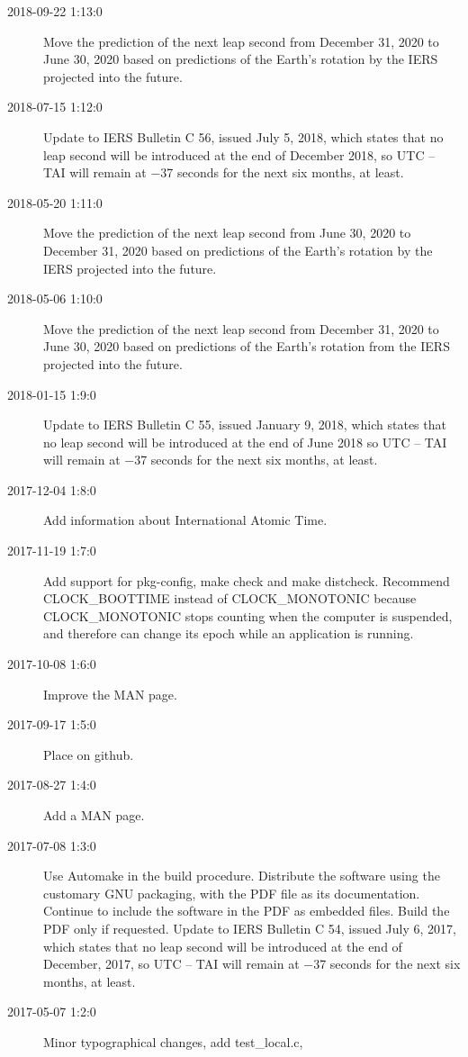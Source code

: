 \documentclass[letterpaper,twoside]{article}
\begin{document}
\begin{description}
\item[2018-09-22 1:13:0] Move the prediction of the next leap second
  from December 31, 2020 to June 30, 2020 based on predictions of
  the Earth's rotation by the IERS projected into the future.
\item[2018-07-15 1:12:0] Update to IERS Bulletin C 56, issued July
  5, 2018, which states that no leap second will be introduced
  at the end of December 2018, so UTC -- TAI will remain at
  \num{-37} seconds for the next six months, at least.
\item[2018-05-20 1:11:0] Move the prediction of the next leap second
  from June 30, 2020 to December 31, 2020 based on predictions of
  the Earth's rotation by the IERS projected into the future.
\item[2018-05-06 1:10:0] Move the prediction of the next leap second
  from December 31, 2020 to June 30, 2020 based on predictions
  of the Earth's rotation from the IERS projected into the future.
\item[2018-01-15 1:9:0] Update to IERS Bulletin C 55, issued
  January 9, 2018, which states that no leap second will be introduced
  at the end of June 2018 so UTC -- TAI will remain at \num{-37} seconds
  for the next six months, at least.
\item[2017-12-04 1:8:0] Add information about International Atomic Time.
\item[2017-11-19 1:7:0] Add support for pkg-config, make check and
  make distcheck.  Recommend CLOCK\_BOOTTIME instead of CLOCK\_MONOTONIC
  because CLOCK\_MONOTONIC stops counting when the computer is suspended,
  and therefore can change its epoch while an application is running.
\item[2017-10-08 1:6:0] Improve the MAN page.
\item[2017-09-17 1:5:0] Place on github.
\item[2017-08-27 1:4:0] Add a MAN page.
\item[2017-07-08 1:3:0] Use Automake in the build procedure.
  Distribute the software using the customary GNU packaging,
  with the PDF file as its documentation.  Continue to include
  the software in the PDF as embedded files.  Build the PDF
  only if requested.  Update to IERS Bulletin C 54, issued
  July 6, 2017, which states that no leap second will be introduced
  at the end of December, 2017, so UTC -- TAI will remain at
  \num{-37} seconds for the next six months, at least.
\item[2017-05-07 1:2:0] Minor typographical changes, add test\_local.c,

\end{description}
\end{document}
